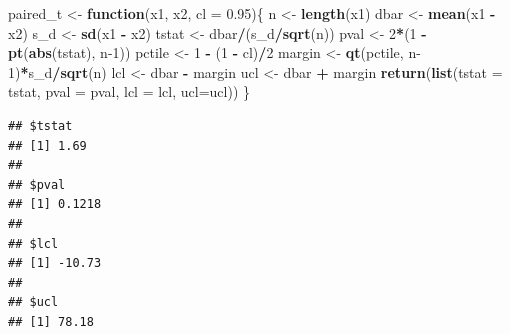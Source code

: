 \documentclass[
]{krantz}
\newenvironment{Shaded}{\begin{snugshade}}{\end{snugshade}}
\newcommand{\ControlFlowTok}[1]{\textcolor[rgb]{0.13,0.29,0.53}{\textbf{#1}}}
\newcommand{\DataTypeTok}[1]{\textcolor[rgb]{0.13,0.29,0.53}{#1}}
\newcommand{\DecValTok}[1]{\textcolor[rgb]{0.00,0.00,0.81}{#1}}
\newcommand{\FloatTok}[1]{\textcolor[rgb]{0.00,0.00,0.81}{#1}}
\newcommand{\KeywordTok}[1]{\textcolor[rgb]{0.13,0.29,0.53}{\textbf{#1}}}
\newcommand{\NormalTok}[1]{#1}
\newcommand{\OperatorTok}[1]{\textcolor[rgb]{0.81,0.36,0.00}{\textbf{#1}}}
\newcommand{\StringTok}[1]{\textcolor[rgb]{0.31,0.60,0.02}{#1}}
\begin{document}
\begin{Shaded}
\begin{Highlighting}[]
\NormalTok{paired\_t \textless{}{-}}\StringTok{ }\ControlFlowTok{function}\NormalTok{(x1, x2, }\DataTypeTok{cl =} \FloatTok{0.95}\NormalTok{)\{}
\NormalTok{    n \textless{}{-}}\StringTok{ }\KeywordTok{length}\NormalTok{(x1)}
\NormalTok{    dbar \textless{}{-}}\StringTok{ }\KeywordTok{mean}\NormalTok{(x1 }\OperatorTok{{-}}\StringTok{ }\NormalTok{x2)}
\NormalTok{    s\_d \textless{}{-}}\StringTok{ }\KeywordTok{sd}\NormalTok{(x1 }\OperatorTok{{-}}\StringTok{ }\NormalTok{x2)}
\NormalTok{    tstat \textless{}{-}}\StringTok{ }\NormalTok{dbar}\OperatorTok{/}\NormalTok{(s\_d}\OperatorTok{/}\KeywordTok{sqrt}\NormalTok{(n))}
\NormalTok{    pval \textless{}{-}}\StringTok{ }\DecValTok{2}\OperatorTok{*}\NormalTok{(}\DecValTok{1} \OperatorTok{{-}}\StringTok{ }\KeywordTok{pt}\NormalTok{(}\KeywordTok{abs}\NormalTok{(tstat), n}\DecValTok{{-}1}\NormalTok{))}
\NormalTok{    pctile \textless{}{-}}\StringTok{ }\DecValTok{1} \OperatorTok{{-}}\StringTok{ }\NormalTok{(}\DecValTok{1} \OperatorTok{{-}}\StringTok{ }\NormalTok{cl)}\OperatorTok{/}\DecValTok{2}
\NormalTok{    margin \textless{}{-}}\StringTok{ }\KeywordTok{qt}\NormalTok{(pctile, n}\DecValTok{{-}1}\NormalTok{)}\OperatorTok{*}\NormalTok{s\_d}\OperatorTok{/}\KeywordTok{sqrt}\NormalTok{(n)}
\NormalTok{    lcl \textless{}{-}}\StringTok{ }\NormalTok{dbar }\OperatorTok{{-}}\StringTok{ }\NormalTok{margin}
\NormalTok{    ucl \textless{}{-}}\StringTok{ }\NormalTok{dbar }\OperatorTok{+}\StringTok{ }\NormalTok{margin}
    \KeywordTok{return}\NormalTok{(}\KeywordTok{list}\NormalTok{(}\DataTypeTok{tstat =}\NormalTok{ tstat, }\DataTypeTok{pval =}\NormalTok{ pval, }\DataTypeTok{lcl =}\NormalTok{ lcl, }\DataTypeTok{ucl=}\NormalTok{ucl))}
\NormalTok{\}}
\end{Highlighting}
\end{Shaded}

\begin{Shaded}
\end{Shaded}

\begin{verbatim}
## $tstat
## [1] 1.69
## 
## $pval
## [1] 0.1218
## 
## $lcl
## [1] -10.73
## 
## $ucl
## [1] 78.18
\end{verbatim}
\end{document}
